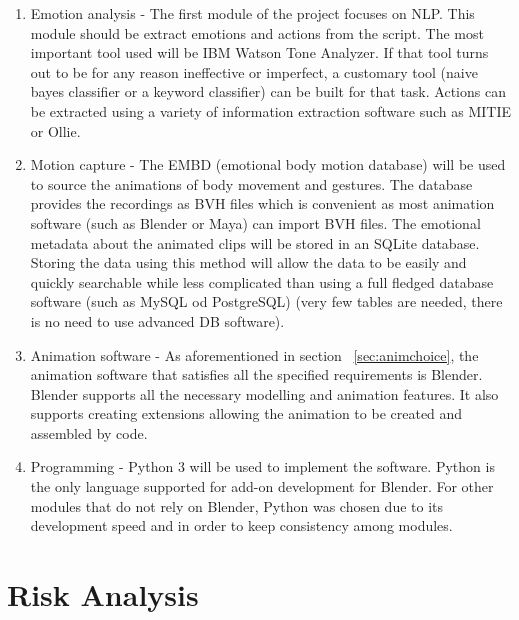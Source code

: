 \begin{enumerate}
\item Emotion analysis - The first module of the project focuses on NLP. This module should be extract emotions and actions from the script. The most important tool used will be IBM Watson Tone Analyzer. If that tool turns out to be for any reason ineffective or imperfect, a customary tool (naive bayes classifier or a keyword classifier) can be built for that task. Actions can be extracted using a variety of information extraction software such as MITIE or Ollie.

\item Motion capture - The EMBD (emotional body motion database) will be used to source the animations of body movement and gestures. The database provides the recordings as BVH files which is convenient as most animation software (such as Blender or Maya) can import BVH files. The emotional metadata about the animated clips will be stored in an SQLite database. Storing the data using this method will allow the data to be easily and quickly searchable while less complicated than using a full fledged database software (such as MySQL od PostgreSQL) (very few tables are needed, there is no need to use advanced DB software).

\item Animation software - As aforementioned in section ~\ref{sec:animchoice}, the animation software that satisfies all the specified requirements is Blender. Blender supports all the necessary modelling and animation features. It also supports creating extensions allowing the animation to be created and assembled by code.

\item Programming - Python 3 will be used to implement the software. Python is the only language supported for add-on development for Blender. For other modules that do not rely on Blender, Python was chosen due to its development speed and in order to keep consistency among modules.

\end{enumerate}

\section{Risk Analysis}
\label{sec:riskanal}

